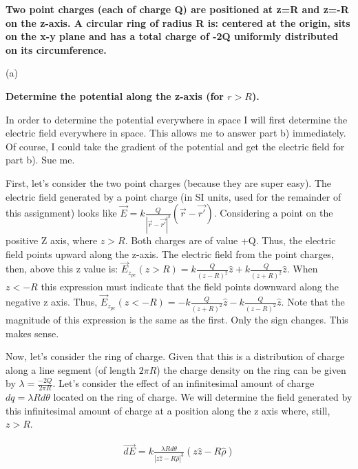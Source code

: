 \begin{homeworkProblem}

\textbf{Two point charges (each of charge Q) are positioned at z=R and z=-R on the z-axis.
A circular ring of radius R is: centered at the origin, sits on the x-y plane and has a total
charge of -2Q uniformly distributed on its circumference. }

\begin{homeworkSection}{(a)}

\textbf{Determine the potential along the z-axis (for $r>R$).}

In order to determine the potential everywhere in space I will first determine the electric field everywhere in space. This allows me to answer part b) immediately. Of course, I could take the gradient of the potential and get the electric field for part b). Sue me.
\\ \par
First, let's consider the two point charges (because they are super easy). The electric field generated by a point charge (in SI units, used for the remainder of this assignment) looks like $\vec{E} = k \frac{Q}{|\vec{r}-\vec{r'}|^3}(\vec{r}-\vec{r'})$. Considering a point on the positive Z axis, where $z > R$. Both charges are of value +Q. Thus, the electric field points upward along the z-axis. The electric field from the point charges, then, above this z value is: $ \vec{E}_{z_{pc}}(z>R) = k \frac{Q}{(z-R)^2}\hat{z} + k \frac{Q}{(z+R)^2}\hat{z} $. When $z < -R$ this expression must indicate that the field points downward along the negative z axis. Thus, $\vec{E}_{z_{pc}}(z<-R) = -k \frac{Q}{(z+R)^2} \hat{z} - k \frac{Q}{(z-R)^2} \hat{z}$. Note that the magnitude of this expression is the same as the first. Only the sign changes. This makes sense.
\\ \par
Now, let's consider the ring of charge. Given that this is a distribution of charge along a line segment (of length $2\pi R$) the charge density on the ring can be given by $\lambda = \frac{-2Q}{2\pi R}$. Let's consider the effect of an infinitesimal amount of charge $dq = \lambda R d\theta$ located on the ring of charge. We will determine the field generated by this infinitesimal amount of charge at a position along the z axis where, still, $z > R$.
\\ \par
\begin{align}
\vec{dE} = k \frac{\lambda R d\theta}{|z\hat{z}-R\hat{\rho}|^3}(z\hat{z} - R\hat{\rho}) \nonumber \\

\end{align}
\end{homeworkSection}
\end{homeworkProblem}
